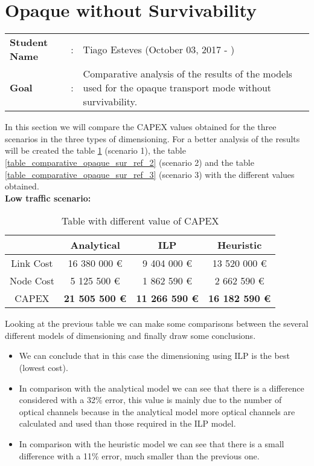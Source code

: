 \clearpage

\section{Opaque without Survivability}\label{comparative_Opaque_Survivability}
\begin{tcolorbox}	
\begin{tabular}{p{2.75cm} p{0.2cm} p{10.5cm}} 	
\textbf{Student Name}  &:& Tiago Esteves    (October 03, 2017 - )\\
\textbf{Goal}          &:& Comparative analysis of the results of the models used for the opaque transport mode without survivability.
\end{tabular}
\end{tcolorbox}
\vspace{11pt}


In this section we will compare the CAPEX values obtained for the three scenarios in the three types of dimensioning. For a better analysis of the results will be created the table \ref{table_comparative_opaque_sur_ref_1} (scenario 1), the table \ref{table_comparative_opaque_sur_ref_2} (scenario 2) and the table \ref{table_comparative_opaque_sur_ref_3} (scenario 3) with the different values obtained.\\

\textbf{Low traffic scenario:}

\begin{table}[h!]
\centering
\begin{tabular}{| c | c | c | c |}
 \hline
   & Analytical & ILP & Heuristic \\
 \hline\hline
 Link Cost & 16 380 000 \euro & 9 404 000 \euro & 13 520 000 \euro \\
 Node Cost & 5 125 500 \euro & 1 862 590 \euro & 2 662 590 \euro \\
 CAPEX & \textbf{21 505 500 \euro} & \textbf{11 266 590 \euro} & \textbf{16 182 590 \euro} \\
 \hline
\end{tabular}
\caption{Table with different value of CAPEX }
\label{table_comparative_opaque_sur_ref_1}
\end{table}

\vspace{11pt}
Looking at the previous table we can make some comparisons between the several different models of dimensioning and finally draw some conclusions.

\begin{itemize}
  \item We can conclude that in this case the dimensioning using ILP is the best (lowest cost).
  \item In comparison with the analytical model we can see that there is a difference considered with a 32\% error, this value is mainly due to the number of optical channels because in the analytical model more optical channels are calculated and used than those required in the ILP model.
  \item In comparison with the heuristic model we can see that there is a small difference with a 11\% error, much smaller than the previous one.
\end{itemize}

